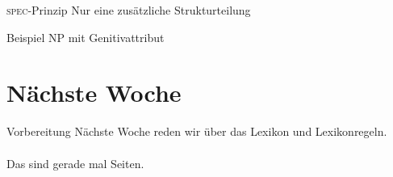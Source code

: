 \begin{frame}
  {\textsc{spec}-Prinzip}
  \onslide<+->
  \onslide<+->
  Nur eine zusätzliche Strukturteilung
\end{frame}

\begin{frame}
  {Beispiel}
  \onslide<+->
  \onslide<+->
  NP mit Genitivattribut
\end{frame}

\section{Nächste Woche}

\begin{frame}
  {Vorbereitung}
  \onslide<+->
  \onslide<+->
  \centering 
  \large
  Nächste Woche reden wir über das Lexikon und Lexikonregeln.\\
  \onslide<+->
  \Zeile
  \\
  \onslide<+->
  \Viertelzeile
  Das sind gerade mal  Seiten.\\
  \onslide<+->
  \Zeile
\end{frame}
